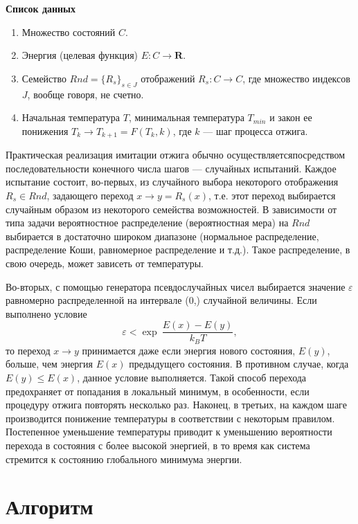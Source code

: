 \documentclass[a4paper]{report}
\begin{document}
\textbf{Список данных}\vspace{-2ex}
\begin{enumerate}
  \item Множество состояний $C$.
  \item Энергия (целевая функция) $E: C\rightarrow\mathbf{R}$.
  \item Семейство $Rnd=\big\{R_s\big\}_{s\in J}$ отображений $R_s\!:C\rightarrow C$, где множество индексов $J$, вообще говоря, не счетно.
  \item Начальная температура $T$, минимальная температура $T_{min}$ и закон ее понижения  $T_k\rightarrow T_{k+1}=F(T_k,k)$, где $k$ --- шаг процесса отжига.
\end{enumerate}

Практическая реализация имитации отжига обычно осуществляется\linebreak посредством последовательности конечного числа шагов --- случайных испытаний. Каждое испытание состоит, во-первых, из случайного выбора некоторого отображения $R_s\in Rnd$, задающего переход $x\rightarrow y=R_s(x)$, т.е. этот переход выбирается случайным образом из некоторого семейства возможностей. В зависимости от типа задачи вероятностное распределение (вероятностная мера) на $Rnd$ выбирается в достаточно широком диапазоне (нормальное распределение, распределение Коши, равномерное распределение и т.д.). Такое распределение, в свою очередь, может зависеть от температуры.

Во-вторых, с помощью генератора псевдослучайных чисел выбирается значение $\varepsilon$ равномерно распределенной на интервале {(0,)} случайной величины. Если выполнено условие
\begin{equation}\label{prob1}
\varepsilon < \exp\:\!\frac{E(x)-E(y)}{k_B T}, \nonumber
\end{equation}
то переход $x \rightarrow y$ принимается даже если энергия нового состояния, $E(y)$, больше, чем энергия $E(x)$ предыдущего состояния. В противном случае, когда $E(y)\leqslant E(x)$, данное условие выполняется. Такой способ перехода предохраняет от попадания в локальный минимум, в особенности, если процедуру отжига повторять несколько раз. Наконец, в третьих, на каждом шаге производится понижение температуры в соответствии с некоторым правилом. Постепенное уменьшение температуры приводит к уменьшению вероятности перехода в состояния с более высокой энергией, в то время как система стремится к состоянию глобального минимума энергии.


\section{Алгоритм}
\end{document}
